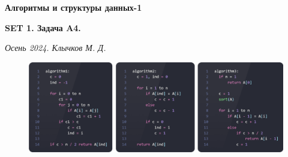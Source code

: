 \documentclass[11pt,a4paper]{scrarticle}
\author{Клычков Максим Дмитриевич}
\theoremstyle{definition}
\begin{document}
\centerline{\textbf{\huge Алгоритмы и структуры данных-1}}
\centerline{\textbf{SET 1. Задача A4.}}
\begin{flushright}
	\emph{Осень 2024. Клычков М. Д.}
\end{flushright}

\begin{figure}[htp]
	\centering
	\includegraphics[width=\textwidth]{code.png}
\end{figure}
\end{document}
